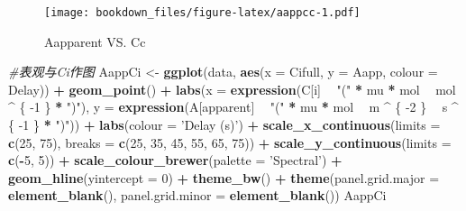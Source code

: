 \documentclass[
]{krantz}
\makeatletter
\newenvironment{Shaded}{\begin{snugshade}}{\end{snugshade}}
\newcommand{\CommentTok}[1]{\textcolor[rgb]{0.56,0.35,0.01}{\textit{#1}}}
\newcommand{\DataTypeTok}[1]{\textcolor[rgb]{0.13,0.29,0.53}{#1}}
\newcommand{\DecValTok}[1]{\textcolor[rgb]{0.00,0.00,0.81}{#1}}
\newcommand{\KeywordTok}[1]{\textcolor[rgb]{0.13,0.29,0.53}{\textbf{#1}}}
\newcommand{\NormalTok}[1]{#1}
\newcommand{\OperatorTok}[1]{\textcolor[rgb]{0.81,0.36,0.00}{\textbf{#1}}}
\newcommand{\StringTok}[1]{\textcolor[rgb]{0.31,0.60,0.02}{#1}}
\newenvironment{kframe}{%
\medskip{}
\setlength{\fboxsep}{.8em}
 \def\at@end@of@kframe{}%
 \ifinner\ifhmode%
  \def\at@end@of@kframe{\end{minipage}}%
  \begin{minipage}{\columnwidth}%
 \fi\fi%
 \def\FrameCommand##1{\hskip\@totalleftmargin \hskip-\fboxsep
 \colorbox{shadecolor}{##1}\hskip-\fboxsep
     \hskip-\linewidth \hskip-\@totalleftmargin \hskip\columnwidth}%
 \MakeFramed {\advance\hsize-\width
   \@totalleftmargin\z@ \linewidth\hsize
   \@setminipage}}%
 {\par\unskip\endMakeFramed%
 \at@end@of@kframe}
\renewenvironment{Shaded}{\begin{kframe}}{\end{kframe}}
\makeatother
\begin{document}
\begin{figure}
\centering
\texttt{[image: bookdown\_files/figure-latex/aappcc-1.pdf]}
\caption{\label{fig:aappcc}Aapparent VS. Cc}
\end{figure}

\begin{Shaded}
\begin{Highlighting}[]
\CommentTok{#表观与Ci作图}
\NormalTok{AappCi <-}\StringTok{ }\KeywordTok{ggplot}\NormalTok{(data, }\KeywordTok{aes}\NormalTok{(}\DataTypeTok{x =}\NormalTok{ Cifull, }\DataTypeTok{y =}\NormalTok{ Aapp, }\DataTypeTok{colour =}\NormalTok{ Delay)) }\OperatorTok{+}
\StringTok{  }\KeywordTok{geom_point}\NormalTok{() }\OperatorTok{+}
\StringTok{  }\KeywordTok{labs}\NormalTok{(}\DataTypeTok{x =} \KeywordTok{expression}\NormalTok{(C[i] }\OperatorTok{~}\StringTok{ "("} \OperatorTok{*}\StringTok{ }\NormalTok{mu }\OperatorTok{*}\StringTok{ }\NormalTok{mol }\OperatorTok{~}\StringTok{ }\NormalTok{mol }\OperatorTok{^}\StringTok{ }\NormalTok{\{}
    \DecValTok{-1}
\NormalTok{  \} }\OperatorTok{*}\StringTok{ ")"}\NormalTok{),}
  \DataTypeTok{y =} \KeywordTok{expression}\NormalTok{(A[apparent] }\OperatorTok{~}\StringTok{ "("} \OperatorTok{*}\StringTok{ }\NormalTok{mu }\OperatorTok{*}\StringTok{ }\NormalTok{mol }\OperatorTok{~}\StringTok{ }\NormalTok{m }\OperatorTok{^}\StringTok{ }\NormalTok{\{}
    \DecValTok{-2}
\NormalTok{  \} }\OperatorTok{~}\StringTok{ }\NormalTok{s }\OperatorTok{^}\StringTok{ }\NormalTok{\{}
    \DecValTok{-1}
\NormalTok{  \} }\OperatorTok{*}\StringTok{ ")"}\NormalTok{)) }\OperatorTok{+}
\StringTok{  }\KeywordTok{labs}\NormalTok{(}\DataTypeTok{colour =} \StringTok{'Delay (s)'}\NormalTok{) }\OperatorTok{+}
\StringTok{  }\KeywordTok{scale_x_continuous}\NormalTok{(}\DataTypeTok{limits =} \KeywordTok{c}\NormalTok{(}\DecValTok{25}\NormalTok{, }\DecValTok{75}\NormalTok{),}
                     \DataTypeTok{breaks =} \KeywordTok{c}\NormalTok{(}\DecValTok{25}\NormalTok{, }\DecValTok{35}\NormalTok{, }\DecValTok{45}\NormalTok{, }\DecValTok{55}\NormalTok{, }\DecValTok{65}\NormalTok{, }\DecValTok{75}\NormalTok{)) }\OperatorTok{+}
\StringTok{  }\KeywordTok{scale_y_continuous}\NormalTok{(}\DataTypeTok{limits =} \KeywordTok{c}\NormalTok{(}\OperatorTok{-}\DecValTok{5}\NormalTok{, }\DecValTok{5}\NormalTok{)) }\OperatorTok{+}
\StringTok{  }\KeywordTok{scale_colour_brewer}\NormalTok{(}\DataTypeTok{palette =} \StringTok{'Spectral'}\NormalTok{) }\OperatorTok{+}
\StringTok{  }\KeywordTok{geom_hline}\NormalTok{(}\DataTypeTok{yintercept =} \DecValTok{0}\NormalTok{) }\OperatorTok{+}
\StringTok{  }\KeywordTok{theme_bw}\NormalTok{() }\OperatorTok{+}
\StringTok{  }\KeywordTok{theme}\NormalTok{(}\DataTypeTok{panel.grid.major =} \KeywordTok{element_blank}\NormalTok{(),}
        \DataTypeTok{panel.grid.minor =} \KeywordTok{element_blank}\NormalTok{())}
\NormalTok{AappCi}
\end{Highlighting}
\end{Shaded}
\end{document}
